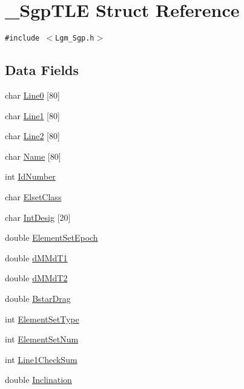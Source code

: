 \hypertarget{struct___sgp_t_l_e}{
\section{\_\-SgpTLE Struct Reference}
\label{struct___sgp_t_l_e}
}
{\tt \#include $<$Lgm\_\-Sgp.h$>$}

\subsection*{Data Fields}
\begin{CompactItemize}
\item 
char \hyperlink{struct___sgp_t_l_e_e82736c1760be22e457d9d40dbeb39b6}{Line0} \mbox{[}80\mbox{]}
\item 
char \hyperlink{struct___sgp_t_l_e_793987b1643141f9bec4786e272d1244}{Line1} \mbox{[}80\mbox{]}
\item 
char \hyperlink{struct___sgp_t_l_e_05f315119f6d3da73fc77ce525f8d373}{Line2} \mbox{[}80\mbox{]}
\item 
char \hyperlink{struct___sgp_t_l_e_d1f4d8ec802a30593b1aadbaf41aa205}{Name} \mbox{[}80\mbox{]}
\item 
int \hyperlink{struct___sgp_t_l_e_8134db9bcf3428082c18dba769258dfd}{IdNumber}
\item 
char \hyperlink{struct___sgp_t_l_e_27655aa07b94161a7cad6c42562c2fd6}{ElsetClass}
\item 
char \hyperlink{struct___sgp_t_l_e_3a15ad7195fd3d6ea5481548706bf091}{IntDesig} \mbox{[}20\mbox{]}
\item 
double \hyperlink{struct___sgp_t_l_e_9292d9013dff34d350a2dd9bf102eb6d}{ElementSetEpoch}
\item 
double \hyperlink{struct___sgp_t_l_e_0ffa4eb7b3b12cc2c8c51d6c300ca61a}{dMMdT1}
\item 
double \hyperlink{struct___sgp_t_l_e_eaac5f4f09ca804c3373fe4f78e8a96b}{dMMdT2}
\item 
double \hyperlink{struct___sgp_t_l_e_542efb643c91709b678e9a08a27d9e40}{BstarDrag}
\item 
int \hyperlink{struct___sgp_t_l_e_c036ab9b5a5d2885f7739225bdebfe4e}{ElementSetType}
\item 
int \hyperlink{struct___sgp_t_l_e_792ff599d71797b42592d89cc27fa00c}{ElementSetNum}
\item 
int \hyperlink{struct___sgp_t_l_e_43803c19029852338bbb6ec4b9c13381}{Line1CheckSum}
\item 
double \hyperlink{struct___sgp_t_l_e_dc4143d3dcc5a8a32498a8d172e0d394}{Inclination}

\end{CompactItemize}
